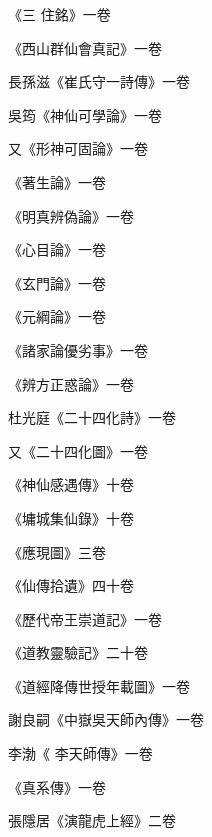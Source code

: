 \begin{pinyinscope}
 《三
 住銘》一卷



 《西山群仙會真記》一卷



 長孫滋《崔氏守一詩傳》一卷



 吳筠《神仙可學論》一卷



 又《形神可固論》一卷



 《著生論》一卷



 《明真辨偽論》一卷



 《心目論》一卷



 《玄門論》一卷



 《元綱論》一卷



 《諸家論優劣事》一卷



 《辨方正惑論》一卷



 杜光庭《二十四化詩》一卷



 又《二十四化圖》一卷



 《神仙感遇傳》十卷



 《墉城集仙錄》十卷



 《應現圖》三卷



 《仙傳拾遺》四十卷



 《歷代帝王崇道記》一卷



 《道教靈驗記》二十卷



 《道經降傳世授年載圖》一卷



 謝良嗣《中嶽吳天師內傳》一卷



 李渤《
 李天師傳》一卷



 《真系傳》一卷



 張隱居《演龍虎上經》二卷




\end{pinyinscope}
